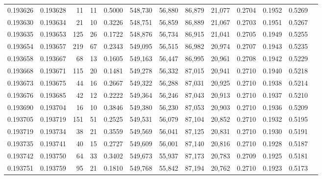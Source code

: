 \begin{tabular}{rrrrrrrrrrrrr}
0.193626 & 0.193628 &    11 &  11 &                                     0.5000 & 548,730 &  56,880 &  86,879 &  21,077 & 0.2704 & 0.1952 & 0.5269 \\
0.193630 & 0.193634 &    21 &  10 &                                     0.3226 & 548,751 &  56,859 &  86,889 &  21,067 & 0.2703 & 0.1951 & 0.5267 \\
0.193635 & 0.193653 &   125 &  26 &                                     0.1722 & 548,876 &  56,734 &  86,915 &  21,041 & 0.2705 & 0.1949 & 0.5255 \\
0.193654 & 0.193657 &   219 &  67 &                                     0.2343 & 549,095 &  56,515 &  86,982 &  20,974 & 0.2707 & 0.1943 & 0.5235 \\
0.193658 & 0.193667 &    68 &  13 &                                     0.1605 & 549,163 &  56,447 &  86,995 &  20,961 & 0.2708 & 0.1942 & 0.5229 \\
0.193668 & 0.193671 &   115 &  20 &                                     0.1481 & 549,278 &  56,332 &  87,015 &  20,941 & 0.2710 & 0.1940 & 0.5218 \\
0.193673 & 0.193675 &    44 &  16 &                                     0.2667 & 549,322 &  56,288 &  87,031 &  20,925 & 0.2710 & 0.1938 & 0.5214 \\
0.193676 & 0.193685 &    42 &  12 &                                     0.2222 & 549,364 &  56,246 &  87,043 &  20,913 & 0.2710 & 0.1937 & 0.5210 \\
0.193690 & 0.193704 &    16 &  10 &                                     0.3846 & 549,380 &  56,230 &  87,053 &  20,903 & 0.2710 & 0.1936 & 0.5209 \\
0.193705 & 0.193719 &   151 &  51 &                                     0.2525 & 549,531 &  56,079 &  87,104 &  20,852 & 0.2710 & 0.1932 & 0.5195 \\
0.193719 & 0.193734 &    38 &  21 &                                     0.3559 & 549,569 &  56,041 &  87,125 &  20,831 & 0.2710 & 0.1930 & 0.5191 \\
0.193735 & 0.193741 &    40 &  15 &                                     0.2727 & 549,609 &  56,001 &  87,140 &  20,816 & 0.2710 & 0.1928 & 0.5187 \\
0.193742 & 0.193750 &    64 &  33 &                                     0.3402 & 549,673 &  55,937 &  87,173 &  20,783 & 0.2709 & 0.1925 & 0.5181 \\
0.193751 & 0.193759 &    95 &  21 &                                     0.1810 & 549,768 &  55,842 &  87,194 &  20,762 & 0.2710 & 0.1923 & 0.5173 \\

\end{tabular}
